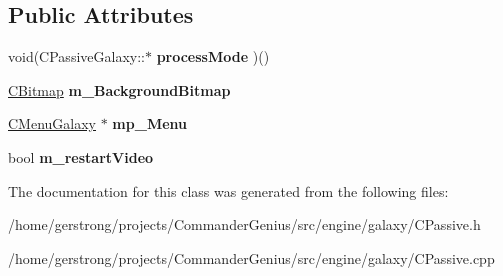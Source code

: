 \subsection*{Public Attributes}
\begin{DoxyCompactItemize}
\item 
\hypertarget{classgalaxy_1_1_c_passive_galaxy_a12e418b780a98ad7b6f74ca4ac8b79fd}{
void(CPassiveGalaxy::$\ast$ {\bfseries processMode} )()}
\label{classgalaxy_1_1_c_passive_galaxy_a12e418b780a98ad7b6f74ca4ac8b79fd}

\item 
\hypertarget{classgalaxy_1_1_c_passive_galaxy_a55b78ed630284fd5ccc2f7d664f24dc3}{
\hyperlink{class_c_bitmap}{CBitmap} {\bfseries m\_\-BackgroundBitmap}}
\label{classgalaxy_1_1_c_passive_galaxy_a55b78ed630284fd5ccc2f7d664f24dc3}

\item 
\hypertarget{classgalaxy_1_1_c_passive_galaxy_a721be5a10964ac5ce338d465fdca6bf5}{
\hyperlink{classgalaxy_1_1_c_menu_galaxy}{CMenuGalaxy} $\ast$ {\bfseries mp\_\-Menu}}
\label{classgalaxy_1_1_c_passive_galaxy_a721be5a10964ac5ce338d465fdca6bf5}

\item 
\hypertarget{classgalaxy_1_1_c_passive_galaxy_a298cd431a99a0991146e979dcf038cee}{
bool {\bfseries m\_\-restartVideo}}
\label{classgalaxy_1_1_c_passive_galaxy_a298cd431a99a0991146e979dcf038cee}

\end{DoxyCompactItemize}


The documentation for this class was generated from the following files:\begin{DoxyCompactItemize}
\item 
/home/gerstrong/projects/CommanderGenius/src/engine/galaxy/CPassive.h\item 
/home/gerstrong/projects/CommanderGenius/src/engine/galaxy/CPassive.cpp\end{DoxyCompactItemize}
